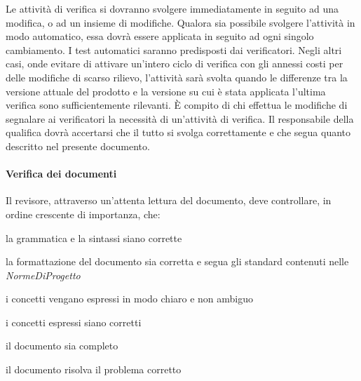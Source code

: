 
Le attivit\`a di verifica si dovranno svolgere immediatamente in seguito ad una modifica, o ad un insieme di modifiche. Qualora sia possibile svolgere l'attivit\`a in modo automatico, essa dovr\`a essere applicata in seguito ad ogni singolo cambiamento. I test automatici saranno predisposti dai verificatori. Negli altri casi, onde evitare di attivare un'intero ciclo di verifica con gli annessi costi per delle modifiche di scarso rilievo, l'attivit\`a sar\`a svolta quando le differenze tra la versione attuale del prodotto e la versione su cui \`e stata applicata l'ultima verifica sono sufficientemente rilevanti. \`E compito di chi effettua le modifiche di segnalare ai verificatori la necessit\`a di un'attivit\`a di verifica. Il responsabile della qualifica dovr\`a accertarsi che il tutto si svolga correttamente e che segua quanto descritto nel presente documento.
\paragraph{Verifica dei documenti} Il revisore, attraverso un'attenta lettura del documento, deve controllare, in ordine crescente di importanza, che:
\begin{elenconumerato}[\textbf{}]{\subsubsecindent}
\item la grammatica e la sintassi siano corrette
\item la formattazione del documento sia corretta e segua gli standard contenuti nelle \textit{NormeDiProgetto}
\item i concetti vengano espressi in modo chiaro e non ambiguo
\item i concetti espressi siano corretti
\item il documento sia completo
\item il documento risolva il problema corretto
\end{elenconumerato}
